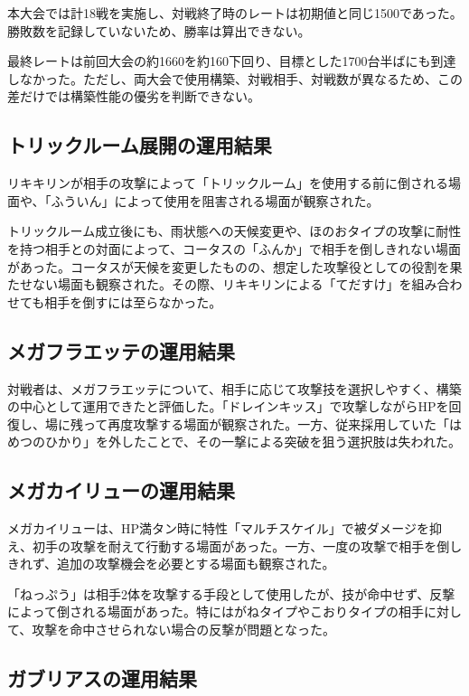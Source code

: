 \documentclass[a4paper,10pt]{ltjsarticle}
\begin{document}
本大会では計18戦を実施し、対戦終了時のレートは初期値と同じ1500であった。勝敗数を記録していないため、勝率は算出できない。

最終レートは前回大会の約1660を約160下回り、目標とした1700台半ばにも到達しなかった。ただし、両大会で使用構築、対戦相手、対戦数が異なるため、この差だけでは構築性能の優劣を判断できない。

\subsection{トリックルーム展開の運用結果}

リキキリンが相手の攻撃によって「トリックルーム」を使用する前に倒される場面や、「ふういん」によって使用を阻害される場面が観察された。

トリックルーム成立後にも、雨状態への天候変更や、ほのおタイプの攻撃に耐性を持つ相手との対面によって、コータスの「ふんか」で相手を倒しきれない場面があった。コータスが天候を変更したものの、想定した攻撃役としての役割を果たせない場面も観察された。その際、リキキリンによる「てだすけ」を組み合わせても相手を倒すには至らなかった。

\subsection{メガフラエッテの運用結果}

対戦者は、メガフラエッテについて、相手に応じて攻撃技を選択しやすく、構築の中心として運用できたと評価した。「ドレインキッス」で攻撃しながらHPを回復し、場に残って再度攻撃する場面が観察された。一方、従来採用していた「はめつのひかり」を外したことで、その一撃による突破を狙う選択肢は失われた。

\subsection{メガカイリューの運用結果}

メガカイリューは、HP満タン時に特性「マルチスケイル」で被ダメージを抑え、初手の攻撃を耐えて行動する場面があった。一方、一度の攻撃で相手を倒しきれず、追加の攻撃機会を必要とする場面も観察された。

「ねっぷう」は相手2体を攻撃する手段として使用したが、技が命中せず、反撃によって倒される場面があった。特にはがねタイプやこおりタイプの相手に対して、攻撃を命中させられない場合の反撃が問題となった。

\subsection{ガブリアスの運用結果}
\end{document}
